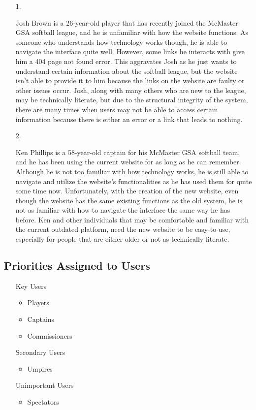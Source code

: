 \documentclass[12pt]{article}
\begin{document}
\begin{itemize}
  \item [1.]
  
  Josh Brown is a 26-year-old player that has recently joined the McMaster GSA
  softball league, and he is unfamiliar with how the website functions. As someone
  who understands how technology works though, he is able to navigate the interface
  quite well. However, some links he interacts with give him a 404 page not found
  error. This aggravates Josh as he just wants to understand certain information
  about the softball league, but the website isn't able to provide it to him
  because the links on the website are faulty or other issues occur. Josh, along
  with many others who are new to the league, may be technically literate, but due
  to the structural integrity of the system, there are many times when users may
  not be able to access certain information because there is either an error or a
  link that leads to nothing.
  \item [2.]
  
  Ken Phillips is a 58-year-old captain for his McMaster GSA softball team, and he has
  been using the current website for as long as he can remember. Although he is not
  too familiar with how technology works, he is still able to navigate and utilize the
  website's functionalities as he has used them for quite some time now. Unfortunately,
  with the creation of the new website, even though the website has the same existing
  functions as the old system, he is not as familiar with how to navigate the interface
  the same way he has before. Ken and other individuals that may be comfortable and
  familiar with the current outdated platform, need the new website to be easy-to-use,
  especially for people that are either older or not as technically literate.
\end{itemize}

\subsection{Priorities Assigned to Users}

\begin{itemize}
  \item [Key Users]
  \begin{itemize}
    \item Players
    \item Captains
    \item Commissioners
  \end{itemize}
  \item [Secondary Users]
  \begin{itemize}
    \item Umpires
  \end{itemize}
  \item [Unimportant Users]
  \begin{itemize}
    \item Spectators
  \end{itemize}
\end{itemize}
\end{document}
